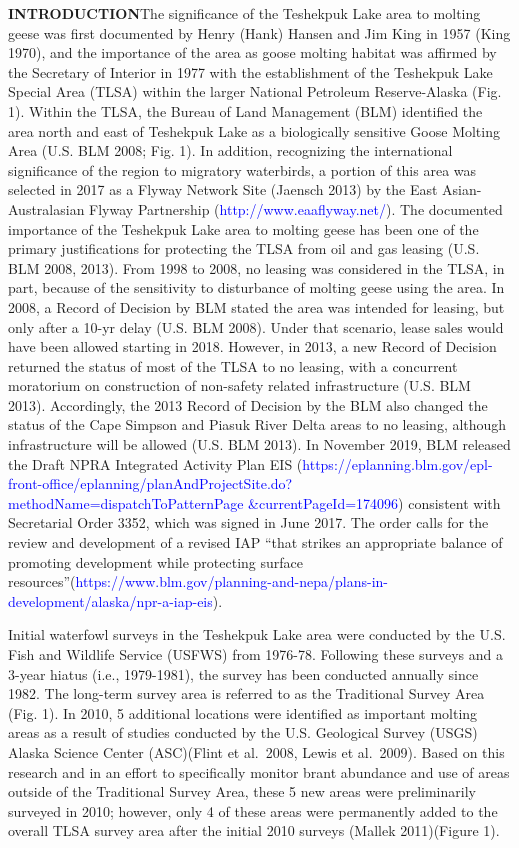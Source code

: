 \documentclass[
]{article}
\begin{document}
\textbf{INTRODUCTION}\break The significance of the Teshekpuk Lake area
to molting geese was first documented by Henry (Hank) Hansen and Jim
King in 1957 (King 1970), and the importance of the area as goose
molting habitat was affirmed by the Secretary of Interior in 1977 with
the establishment of the Teshekpuk Lake Special Area (TLSA) within the
larger National Petroleum Reserve-Alaska (Fig. 1). Within the TLSA, the
Bureau of Land Management (BLM) identified the area north and east of
Teshekpuk Lake as a biologically sensitive Goose Molting Area (U.S. BLM
2008; Fig. 1). In addition, recognizing the international significance
of the region to migratory waterbirds, a portion of this area was
selected in 2017 as a Flyway Network Site (Jaensch 2013) by the East
Asian-Australasian Flyway Partnership
(\textcolor{blue}{http://www.eaaflyway.net/}). The documented importance
of the Teshekpuk Lake area to molting geese has been one of the primary
justifications for protecting the TLSA from oil and gas leasing (U.S.
BLM 2008, 2013). From 1998 to 2008, no leasing was considered in the
TLSA, in part, because of the sensitivity to disturbance of molting
geese using the area. In 2008, a Record of Decision by BLM stated the
area was intended for leasing, but only after a 10-yr delay (U.S. BLM
2008). Under that scenario, lease sales would have been allowed starting
in 2018. However, in 2013, a new Record of Decision returned the status
of most of the TLSA to no leasing, with a concurrent moratorium on
construction of non-safety related infrastructure (U.S. BLM 2013).
Accordingly, the 2013 Record of Decision by the BLM also changed the
status of the Cape Simpson and Piasuk River Delta areas to no leasing,
although infrastructure will be allowed (U.S. BLM 2013). In November
2019, BLM released the Draft NPRA Integrated Activity Plan EIS
(\textcolor{blue}{https://eplanning.blm.gov/epl-front-office/eplanning/planAndProjectSite.do?methodName=dispatchToPatternPage \&currentPageId=174096})
consistent with Secretarial Order 3352, which was signed in June 2017.
The order calls for the review and development of a revised IAP ``that
strikes an appropriate balance of promoting development while protecting
surface
resources''(\textcolor{blue}{https://www.blm.gov/planning-and-nepa/plans-in-development/alaska/npr-a-iap-eis}).

Initial waterfowl surveys in the Teshekpuk Lake area were conducted by
the U.S. Fish and Wildlife Service (USFWS) from 1976-78. Following these
surveys and a 3-year hiatus (i.e., 1979-1981), the survey has been
conducted annually since 1982. The long-term survey area is referred to
as the Traditional Survey Area (Fig. 1). In 2010, 5 additional locations
were identified as important molting areas as a result of studies
conducted by the U.S. Geological Survey (USGS) Alaska Science Center
(ASC)(Flint et al.~2008, Lewis et al.~2009). Based on this research and
in an effort to specifically monitor brant abundance and use of areas
outside of the Traditional Survey Area, these 5 new areas were
preliminarily surveyed in 2010; however, only 4 of these areas were
permanently added to the overall TLSA survey area after the initial 2010
surveys (Mallek 2011)(Figure 1).
\end{document}
